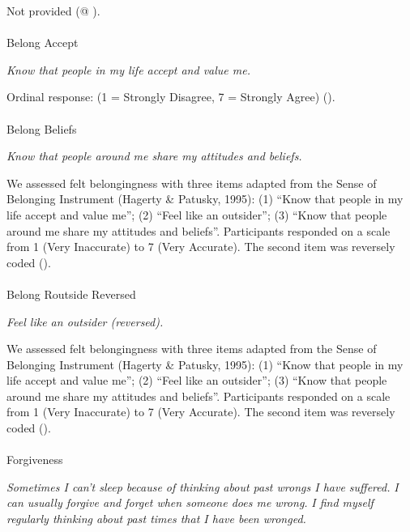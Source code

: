 \documentclass[
  single column]{article}
\makeatletter
\let\oldparagraph\paragraph
\renewcommand{\paragraph}{
    \@ifstar
      \xxxParagraphStar
      \xxxParagraphNoStar
  }
\newcommand{\xxxParagraphStar}[1]{\oldparagraph*{#1}\mbox{}}
\newcommand{\xxxParagraphNoStar}[1]{\oldparagraph{#1}\mbox{}}
\makeatother
\begin{document}
Not provided (@ ).

\paragraph{Belong Accept}\label{belong-accept}

\emph{Know that people in my life accept and value me.}

Ordinal response: (1 = Strongly Disagree, 7 = Strongly Agree)
().

\paragraph{Belong Beliefs}\label{belong-beliefs}

\emph{Know that people around me share my attitudes and beliefs.}

We assessed felt belongingness with three items adapted from the Sense
of Belonging Instrument (Hagerty \& Patusky, 1995): (1) ``Know that
people in my life accept and value me''; (2) ``Feel like an outsider'';
(3) ``Know that people around me share my attitudes and beliefs''.
Participants responded on a scale from 1 (Very Inaccurate) to 7 (Very
Accurate). The second item was reversely coded
().

\paragraph{Belong Routside Reversed}\label{belong-routside-reversed}

\emph{Feel like an outsider (reversed).}

We assessed felt belongingness with three items adapted from the Sense
of Belonging Instrument (Hagerty \& Patusky, 1995): (1) ``Know that
people in my life accept and value me''; (2) ``Feel like an outsider'';
(3) ``Know that people around me share my attitudes and beliefs''.
Participants responded on a scale from 1 (Very Inaccurate) to 7 (Very
Accurate). The second item was reversely coded
().

\paragraph{Forgiveness}\label{forgiveness}

\emph{Sometimes I can't sleep because of thinking about past wrongs I
have suffered.} \emph{I can usually forgive and forget when someone does
me wrong.} \emph{I find myself regularly thinking about past times that
I have been wronged.}
\end{document}
